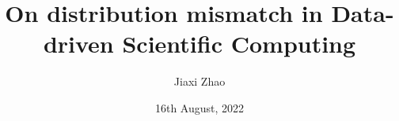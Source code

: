 \documentclass{beamer}
\title[Distribution Mismatch]{On distribution mismatch in Data-driven Scientific Computing}
\author[J. Zhao]{Jiaxi Zhao}
\date{16th August, 2022}
\begin{document}
\par \setlength{\parindent}{2em}

\begin{frame}
\titlepage

\end{frame}

\end{document}

